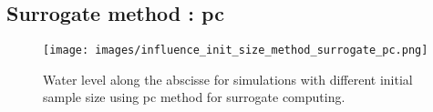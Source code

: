 \documentclass[hidelinks,12pt]{article}
\begin{document}
\subsection{Surrogate method : pc}

\begin{figure}[!t]
  \centering
  \texttt{[image: images/influence\_init\_size\_method\_surrogate\_pc.png]}
  \caption{Water level along the abscisse for simulations with different initial sample size using pc method for surrogate computing.}
  	\label{influence_init_size_method_surrogate_kriging}
\end{figure}
\end{document}
